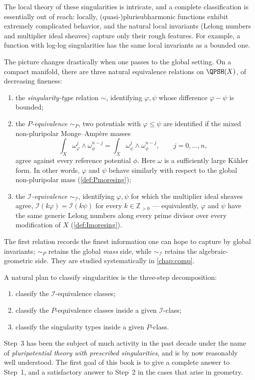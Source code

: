 The local theory of these singularities is intricate, and a complete classification is essentially out of reach: locally, (quasi-)plurisubharmonic functions exhibit extremely complicated behavior, and the natural local invariants (Lelong numbers and multiplier ideal sheaves) capture only their rough features. For example, a function with log-log singularities has the same local invariants as a bounded one.

The picture changes drastically when one passes to the global setting. On a compact manifold, there are three natural equivalence relations on $\QPSH(X)$, of decreasing fineness:
\begin{enumerate}
    \item\label{itm:preface:L22:1} the \emph{singularity-type} relation $\sim$, identifying $\varphi,\psi$ whose difference $\varphi-\psi$ is bounded;
    \item\label{itm:preface:L22:2} the \emph{$P$-equivalence} $\sim_P$, two potentials with $\varphi\leq \psi$ are identified if the mixed non-pluripolar Monge--Amp\`ere masses
    \[
        \int_X \omega_\varphi^j\wedge \omega_\phi^{n-j} = \int_X \omega_\psi^j\wedge \omega_\phi^{n-j},\qquad j=0,\ldots,n,
    \]
    agree against every reference potential $\phi$. Here $\omega$ is a sufficiently large Kähler form. In other words, $\varphi$ and $\psi$ behave similarly with respect to the global non-pluripolar mass (\cref{def:Pmoresing});
    \item\label{itm:preface:L22:3} the \emph{$\mathcal{I}$-equivalence} $\sim_\mathcal{I}$, identifying $\varphi,\psi$ for which the multiplier ideal sheaves agree, $\mathcal{I}(k\varphi)=\mathcal{I}(k\psi)$ for every $k\in\mathbb{Z}_{>0}$ --- equivalently, $\varphi$ and $\psi$ have the same generic Lelong numbers along every prime divisor over every modification of $X$ (\cref{def:Imoresing}).
\end{enumerate}
The first relation records the finest information one can hope to capture by global invariants; $\sim_P$ retains the global \emph{mass} side, while $\sim_\mathcal{I}$ retains the algebraic-geometric side. They are studied systematically in \cref{chap:comp}.

A natural plan to classify singularities is the three-step decomposition:
\begin{enumerate}
    \item\label{itm:preface:L34:1} classify the $\mathcal{I}$-equivalence classes;
    \item\label{itm:preface:L34:2} classify the $P$-equivalence classes inside a given $\mathcal{I}$-class;
    \item\label{itm:preface:L34:3} classify the singularity types inside a given $P$-class.
\end{enumerate}
Step~3 has been the subject of much activity in the past decade under the name of \emph{pluripotential theory with prescribed singularities}, and is by now reasonably well understood. The first goal of this book is to give a complete answer to Step~1, and a satisfactory answer to Step~2 in the cases that arise in geometry.

